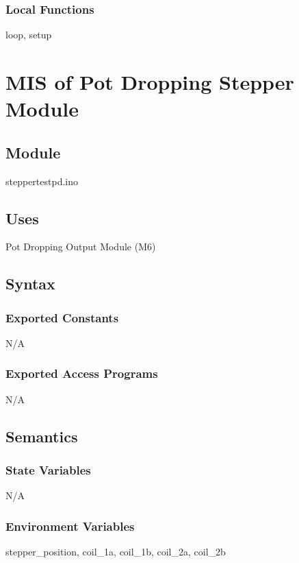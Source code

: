 \documentclass[12pt, titlepage]{article}
\begin{document}
\subsubsection{Local Functions}

loop, setup

  \section{MIS of Pot Dropping Stepper Module} \label{potdroppingstepper} 

\subsection{Module}

steppertestpd.ino

\subsection{Uses}
Pot Dropping Output Module (M6) 

\subsection{Syntax}

\subsubsection{Exported Constants}
N/A
\subsubsection{Exported Access Programs}
N/A

\subsection{Semantics}

\subsubsection{State Variables}

N/A

\subsubsection{Environment Variables}

stepper\_position, coil\_1a, coil\_1b, coil\_2a, coil\_2b
\end{document}
